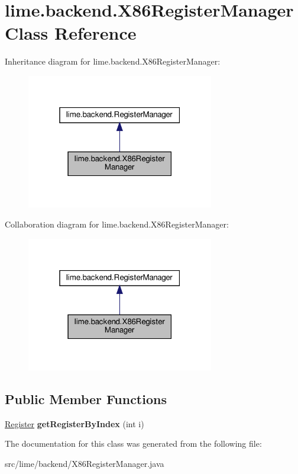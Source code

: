 \hypertarget{classlime_1_1backend_1_1X86RegisterManager}{}\section{lime.\+backend.\+X86\+Register\+Manager Class Reference}
\label{classlime_1_1backend_1_1X86RegisterManager}


Inheritance diagram for lime.\+backend.\+X86\+Register\+Manager\+:
\nopagebreak
\begin{figure}[H]
\begin{center}
\leavevmode
\includegraphics[width=232pt]{classlime_1_1backend_1_1X86RegisterManager__inherit__graph}
\end{center}
\end{figure}


Collaboration diagram for lime.\+backend.\+X86\+Register\+Manager\+:
\nopagebreak
\begin{figure}[H]
\begin{center}
\leavevmode
\includegraphics[width=232pt]{classlime_1_1backend_1_1X86RegisterManager__coll__graph}
\end{center}
\end{figure}
\subsection*{Public Member Functions}
\begin{DoxyCompactItemize}
\item 
\mbox{\label{classlime_1_1backend_1_1X86RegisterManager_ae911870fa55721c5977c22c2b5a0d2ae}} 
\hyperlink{classlime_1_1backend_1_1Register}{Register} {\bfseries get\+Register\+By\+Index} (int i)
\end{DoxyCompactItemize}


The documentation for this class was generated from the following file\+:\begin{DoxyCompactItemize}
\item 
src/lime/backend/X86\+Register\+Manager.\+java\end{DoxyCompactItemize}
